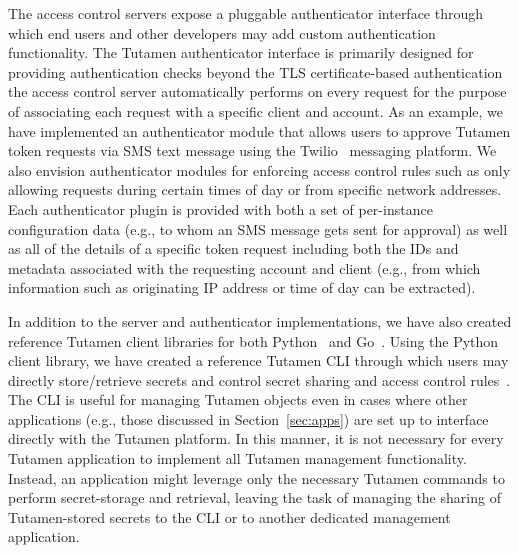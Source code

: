 The access control servers expose a pluggable authenticator interface
through which end users and other developers may add custom
authentication functionality. The Tutamen authenticator interface is
primarily designed for providing authentication checks beyond the TLS
certificate-based authentication the access control server
automatically performs on every request for the purpose of associating
each request with a specific client and account. As an example, we
have implemented an authenticator module that allows users to approve
Tutamen token requests via SMS text message using the
Twilio~\cite{twilio} messaging platform. We also envision
authenticator modules for enforcing access control rules such as only
allowing requests during certain times of day or from specific network
addresses. Each authenticator plugin is provided with both a set of
per-instance configuration data (e.g., to whom an SMS message gets
sent for approval) as well as all of the details of a specific token
request including both the IDs and metadata associated with the
requesting account and client (e.g., from which information such as
originating IP address or time of day can be extracted).

In addition to the server and authenticator implementations, we have
also created reference Tutamen client libraries for both
Python~\cite{src-tutamen-pytutamen} and
Go~\cite{src-tutamen-go}. Using the Python client library, we have
created a reference Tutamen CLI through which users may directly
store/retrieve secrets and control secret sharing and access control
rules~\cite{src-tutamen-tutamencli}. The CLI is useful for managing
Tutamen objects even in cases where other applications (e.g., those
discussed in Section~\ref{sec:apps}) are set up to interface directly
with the Tutamen platform. In this manner, it is not necessary for
every Tutamen application to implement all Tutamen management
functionality. Instead, an application might leverage only the
necessary Tutamen commands to perform secret-storage and retrieval,
leaving the task of managing the sharing of Tutamen-stored secrets to
the CLI or to another dedicated management application.

